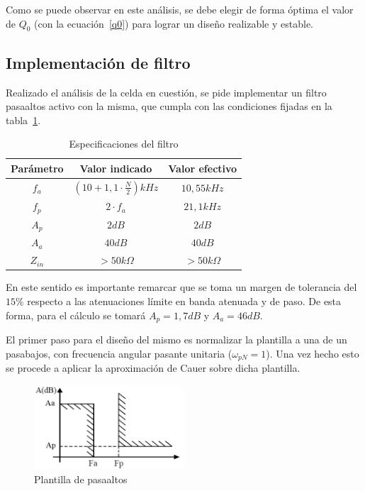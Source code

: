 Como se puede observar en este an\'alisis, se debe elegir de forma \'optima el valor de $Q_0$ (con la ecuaci\'on~\ref{q0}) para lograr un dise\~no realizable y estable.


\subsection{Implementaci\'on de filtro}
Realizado el an\'alisis de la celda en cuesti\'on, se pide implementar un filtro pasaaltos activo con la misma, que cumpla con las condiciones fijadas en la tabla~\ref{tabla_filtro}.

\begin{table}[H]
    \centering
    \begin{tabular}{c c c}
        Par\'ametro & Valor indicado & Valor efectivo \\
        \hline
         $f_a$ & $\left( 10+1,1\cdot \frac{N}{2} \right) kHz$  & $10,55 kHz$  \\
         $f_p$ & $2 \cdot f_a $ & $21,1kHz$  \\
         $A_p$ & $2dB$ & $2dB$ \\
         $A_a$ & $40dB$ & $40dB$  \\
         $Z_{in}$ & $>50k\Omega$ & $>50k\Omega$  \\
    \end{tabular}
    \caption{Especificaciones del filtro}
    \label{tabla_filtro}
\end{table}

En este sentido es importante remarcar que se toma un margen de tolerancia del $15\%$ respecto a las atenuaciones l\'imite en banda atenuada y de paso. De esta forma, para el c\'alculo se tomar\'a $A_p = 1,7dB$ y $A_a = 46dB$. 

El primer paso para el dise\~no del mismo es normalizar la plantilla a una de un pasabajos, con frecuencia angular pasante unitaria ($\omega_{pN} = 1$). Una vez hecho esto se procede a aplicar la aproximaci\'on de Cauer sobre dicha plantilla.

\begin{figure}[H] \label{fig:EJ3_highpass_template}
    \centering
    \includegraphics[width=0.5\textwidth]{../EJ3/Resources/highpass_template.png}
    \caption{Plantilla de pasaaltos}
\end{figure}


